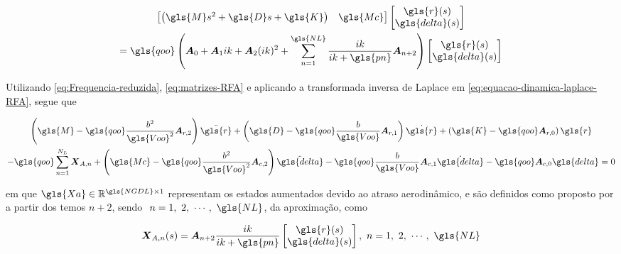 \begin{multline}\label{eq:equacao-dinamica-laplace-RFA}
    \begin{bmatrix}
         \left(\gls{M}s^2+\gls{D}s+\gls{K} \right) & \gls{Mc}
    \end{bmatrix}
    \begin{bmatrix}
        \gls{r}(s) \\ \gls{delta}(s)
    \end{bmatrix} \\
    =
    \gls{qoo} \left( 
    \boldsymbol{A}_{0} + \boldsymbol{A}_{1}ik + \boldsymbol{A}_{2}(ik)^2 + \sum_{n=1}^{\gls{NL}} \frac{ik}{ik+\gls{pn}}\boldsymbol{A}_{n+2} \right)
    \begin{bmatrix}
        \gls{r}(s) \\ \gls{delta}(s)
    \end{bmatrix}
\end{multline}

Utilizando \eqref{eq:Frequencia-reduzida}, \eqref{eq:matrizes-RFA} e aplicando a transformada inversa de Laplace em \eqref{eq:equacao-dinamica-laplace-RFA}, segue que

\begin{multline}\label{eq:equacao-movimento-RFA}
    \left(\gls{M} - \gls{qoo}\frac{b^2}{\gls{Voo}^2}\boldsymbol{A}_{r,2}\right)\ddot{\gls{r}} + \left(\gls{D} - \gls{qoo}\frac{b}{\gls{Voo}}\boldsymbol{A}_{r,1} \right) \dot{\gls{r}} +  \left(\gls{K} - \gls{qoo}\boldsymbol{A}_{r,0} \right)\gls{r} \\ - \gls{qoo}\sum_{n=1}^{N_{L}}\boldsymbol{X}_{A,n} + \left(\gls{Mc} - \gls{qoo}\frac{b^2}{\gls{Voo}^2}\boldsymbol{A}_{c,2}\right)\ddot{\gls{delta}} - \gls{qoo}\frac{b}{\gls{Voo}}\boldsymbol{A}_{c,1} \dot{\gls{delta}} - \gls{qoo}\boldsymbol{A}_{c,0}\gls{delta} = 0
\end{multline}

\noindent em que $\gls{Xa} \in \mathbb{R}^{ \gls{NGDL} \times 1}$ representam os estados aumentados devido ao atraso aerodinâmico, e são definidos como proposto por \textcite{art:NASA2776} a partir dos temos $n+2$, sendo $\ n=1,\ 2,\ \cdots, \ \gls{NL}$, da aproximação, como

\begin{equation}\label{eq:estados-atraso-aerodinamicos}
    \boldsymbol{X}_{A,n}(s) = \boldsymbol{A}_{n+2}\frac{ik}{ik+\gls{pn}}
    \begin{bmatrix}
        \gls{r}(s) \\ \gls{delta}(s)
    \end{bmatrix}, \ n = 1,\ 2,\ \cdots,\ \gls{NL} 
\end{equation}

